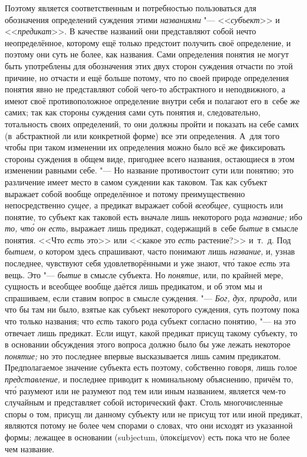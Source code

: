 Поэтому является соответственным и потребностью пользоваться
для обозначения определений суждения этими
{\em названиями} "--- <<{\em субъект}>> и <<{\em предикат}>>.
В качестве названий они представляют собой нечто
неопределённое, которому ещё только предстоит получить своё определение, и
поэтому они суть не более, как названия. Сами определения понятия не могут
быть употреблены для обозначения этих двух сторон суждения отчасти по этой
причине, но отчасти и ещё больше потому, что по своей природе определения
понятия явно не представляют собой чего-то абстрактного и неподвижного, а
имеют своё противоположное определение внутри себя и полагают его в~себе же
самих; так как стороны суждения сами суть понятия и,
следовательно, тотальность своих определений, то они должны пройти и
показать на себе самих (в~абстрактной ли или конкретной форме) все эти
определения. А~для того чтобы при таком изменении их определения можно было
всё же фиксировать стороны суждения в общем виде, пригоднее всего названия,
остающиеся в этом изменении равными себе. "--- Но название
противостоит сути или понятию; это различение имеет место в самом суждении
как таковом. Так как субъект выражает собой вообще определённое и потому
преимущественно непосредственно {\em сущее,} а предикат
выражает собой {\em всеобщее,}
сущность или понятие, то субъект как таковой есть вначале
лишь некоторого рода {\em название;} ибо {\em то, чт\'{о} он есть,}
выражает лишь предикат, содержащий в~себе {\em бытие} в смысле
понятия. <<Что {\em есть} это>> или <<какое это {\em есть} растение?>>
и~т.~д. Под {\em бытием,}
о котором здесь спрашивают, часто понимают лишь {\em название,} и, узнав
последнее, чувствуют себя удовлетворёнными и уже знают, чт\'{о} такое
{\em есть} эта вещь. Это "--- {\em бытие} в смысле субъекта. Но
{\em понятие},
или, по крайней мере, сущность и всеобщее вообще даётся лишь
предикатом, и об этом мы и спрашиваем, если ставим вопрос в смысле
суждения. "--- {\em Бог, дух, природа,} или что бы
там ни было, взятые как субъект некоторого суждения, суть поэтому пока что
только названия; что {\em есть} такого рода субъект согласно понятию, "--- на
это отвечает лишь предикат. Если ищут, какой предикат присущ такому субъекту,
то в основании обсуждения этого вопроса должно было бы уже лежать некоторое
{\em понятие;} но это последнее впервые высказывается лишь
самим предикатом. Предполагаемое значение субъекта есть
поэтому, собственно говоря, лишь голое {\em представление,}
и последнее приводит к номинальному объяснению, причём то, чт\'{о} разумеют
или не разумеют под тем или иным названием, является чем-то случайным и
представляет собой исторический факт. Столь многочисленные споры о том,
присущ ли данному субъекту или не присущ тот или иной предикат, являются
потому не более чем спорами о словах, что они исходят из указанной формы;
лежащее в основании (subjectum, \textgreek{ὑποκείμενον}) есть пока
что не более чем название.

